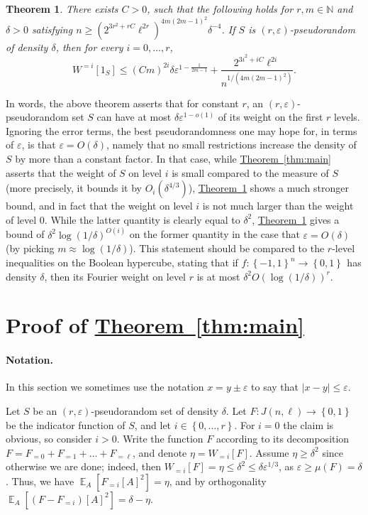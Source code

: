 \documentclass[11pt]{article}
\newcommand{\expref}[2]{\texorpdfstring{\hyperref[#2]{#1~\ref{#2}}}{#1~\ref{#2}}}
\newtheorem{theorem}{Theorem}[section]
\newcommand\card[1]{\left| {#1} \right|}
\newcommand\set[1]{{\left\{ #1 \right\}}}
\newcommand\Expect[2]{{\mathop{\mathbb{E}}_{#1}\left[ {#2} \right]}}
\newcommand\power[1]{\set{0,1}^{#1}}
\newcommand\cube[1]{ { \set{-1,1}^{#1} } }
\newcommand\eps{\varepsilon}
\renewcommand\geq{\geqslant}
\renewcommand\leq{\leqslant}
\newcommand\lvlfn[2]{{#1}_{={#2}}}
\begin{document}
\begin{theorem}\label{thm:main3}
There exists $C>0$, such that the following holds for $r,m\in\mathbb{N}$ and $\delta>0$ satisfying
$n\geq (2^{3r^2+rC}\ell^{2r})^{4m(2m-1)^2}\delta^{-4}$.
If $S$ is $(r,\eps)$-pseudorandom of density $\delta$, then for every $i=0,\ldots,r$,
\[
W^{=i}[1_S] \leq
(C m)^{2i}\delta\eps^{1-\frac{1}{2m-1}}
+\frac{2^{3i^2+iC}\ell^{2i}}{n^{1/(4m(2m-1)^2)}}.
\]
%
\end{theorem}


In words, the above theorem asserts that for constant $r$, an $(r,\eps)$-pseudorandom set $S$
can have at most $\delta\eps^{1-o(1)}$ of its weight on the first $r$ levels. Ignoring the error terms,
the best pseudorandomness one may hope for, in terms of $\eps$, is that $\eps = O(\delta)$, namely that
no small restrictions increase the density of $S$ by more than a constant factor. In that case, while \expref{Theorem}{thm:main}
asserts that the weight of $S$ on level $i$ is small compared to the measure of $S$ (more precisely, it bounds it by
$O_i(\delta^{4/3})$), \expref{Theorem}{thm:main3} shows a much stronger bound, and in fact that the weight on level $i$
is not much larger than the weight of level $0$.
While the latter quantity is clearly equal to $\delta^2$, \expref{Theorem}{thm:main3} gives a bound of $\delta^2 \log(1/\delta)^{O(i)}$
on the former quantity in the case that $\eps = O(\delta)$ (by picking $m \approx \log(1/\delta)$). %
%
%
%
This statement should be compared to the $r$-level inequalities on the Boolean hypercube, stating that if
$f\colon \cube{n}\to\power{}$ has density $\delta$, then its Fourier weight on level $r$ is at most $\delta^2O(\log(1/\delta))^r$.
%




\section{Proof of \expref{Theorem}{thm:main}}\label{section:main_pf}
\paragraph{Notation.} In this section we sometimes use the notation $x=y\pm \eps$ to say that $\card{x-y}\leq \eps$.


Let $S$ be an $(r,\eps)$-pseudorandom set of density $\delta$.
Let $F\colon J(n,\ell)\to\power{}$ be the indicator function of $S$, and let $i\in\set{0,...,r}$.
For $i=0$ the claim is obvious, so consider $i>0$.
Write the function $F$ according to its decomposition $F=\lvlfn{F}{0}+\lvlfn{F}{1}+\ldots+\lvlfn{F}{\ell}$, and denote
$\eta = W_{=i}[F]$. Assume $\eta\geq \delta^2$ since otherwise we are done; indeed, then
$W_{=i}[F] = \eta \leq \delta^2\leq \delta \eps^{1/3}$, as $\eps\geq \mu(F) = \delta$.
Thus, we have $\Expect{A}{\lvlfn{F}{i}[A]^2} = \eta$, and by orthogonality $\Expect{A}{(F-\lvlfn{F}{i})[A]^2}=\delta-\eta$.
%
%
%
%
\end{document}
